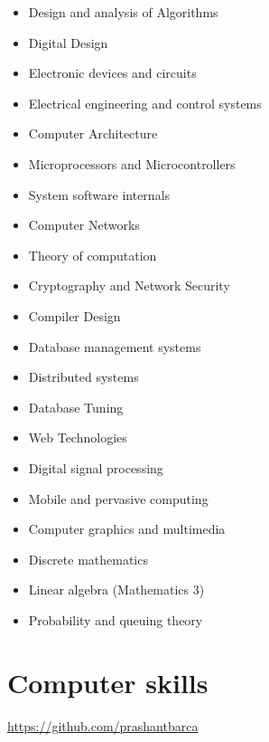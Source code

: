 \documentclass[11pt,a4paper,sans]{moderncv} %
\begin{document}
\begin{itemize}
\item Design and analysis of Algorithms
\item Digital Design
\item Electronic devices and circuits
\item Electrical engineering and control systems
\item Computer Architecture
\item Microprocessors and Microcontrollers
\item System software internals
\item Computer Networks
\item Theory of computation
\item Cryptography and Network Security
\item Compiler Design
\item Database management systems
\item Distributed systems
\item Database Tuning
\item Web Technologies
\item Digital signal processing
\item Mobile and pervasive computing
\item Computer graphics and multimedia
\item Discrete mathematics
\item Linear algebra (Mathematics 3)
\item Probability and queuing theory

\end{itemize}
        

\section{Computer skills}

  {\url{https://github.com/prashantbarca}}
\end{document}
